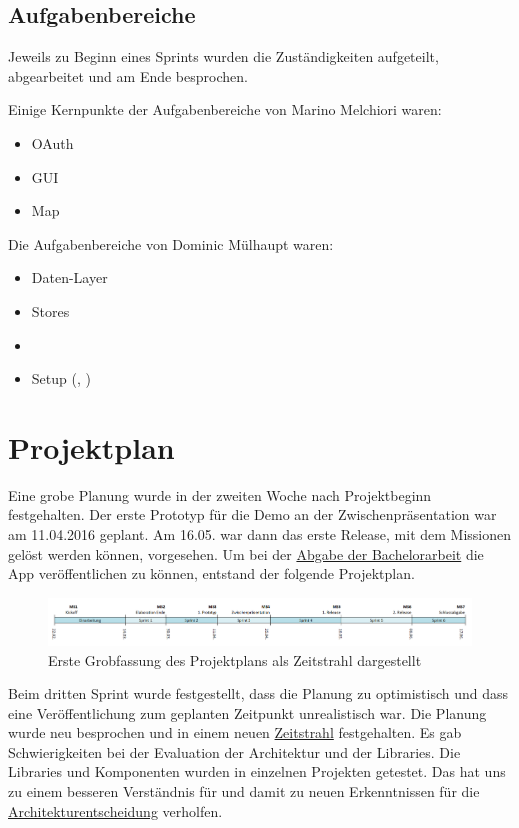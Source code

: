 \subsection*{Aufgabenbereiche}
Jeweils zu Beginn eines Sprints wurden die Zuständigkeiten aufgeteilt, abgearbeitet und am Ende besprochen. 

Einige Kernpunkte der Aufgabenbereiche von Marino Melchiori waren:
\begin{itemize}
	\item \gls{OAuth}
	\item \gls{GUI}
	\item Map
\end{itemize}

Die Aufgabenbereiche von Dominic Mülhaupt waren:
\begin{itemize}
	\item Daten-Layer
	\item Stores
	\item {}
	\item Setup (, )
\end{itemize}




\section{Projektplan}
\label{pm-projektplan}

Eine grobe Planung wurde in der zweiten Woche nach Projektbeginn festgehalten. 
Der erste Prototyp für die Demo an der Zwischenpräsentation war am 11.04.2016 geplant. 
Am 16.05. war dann das erste Release, mit dem Missionen gelöst werden können, vorgesehen. 
Um bei der \hyperref[pm-projektmanagement-risikomanagement-r01]{Abgabe der Bachelorarbeit} die App veröffentlichen zu können, entstand der folgende Projektplan.

\begin{figure}[H]
	\centering
	\includegraphics[width=\textwidth]{images/projektmanagement/zeitstrahl_v1.png}
	\caption{Erste Grobfassung des Projektplans als Zeitstrahl dargestellt}
	\label{image-project-plan-timeline1}
\end{figure}

Beim dritten Sprint wurde festgestellt, dass die Planung zu optimistisch und dass eine Veröffentlichung zum geplanten Zeitpunkt unrealistisch war. 
Die Planung wurde neu besprochen und in einem neuen \hyperref[image-project-plan-timeline2]{Zeitstrahl} festgehalten. 
Es gab Schwierigkeiten bei der Evaluation der Architektur und der Libraries. 
Die Libraries und Komponenten wurden in einzelnen Projekten getestet. 
Das hat uns zu einem besseren Verständnis für  und damit zu neuen Erkenntnissen für die \hyperref[tb-evaluation-architektur]{Architekturentscheidung} verholfen. 

